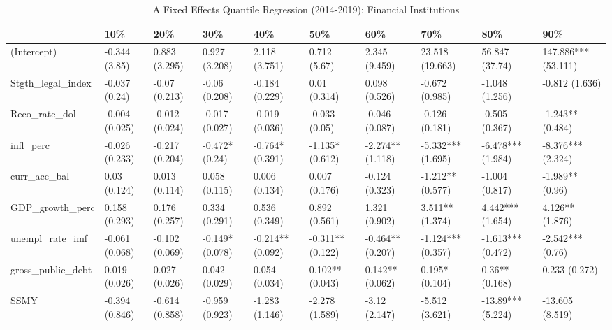 \begin{table}[ht]
\centering
\caption{A Fixed Effects Quantile Regression (2014-2019): Financial Institutions} 
\begingroup\small
\begin{tabular}{llllllllll}
  \toprule
 & 10\% & 20\% & 30\% & 40\% & 50\% & 60\% & 70\% & 80\% & 90\% \\ 
  \midrule
(Intercept) & -0.344 (3.85) & 0.883 (3.295) & 0.927 (3.208) & 2.118 (3.751) & 0.712 (5.67) & 2.345 (9.459) & 23.518 (19.663) & 56.847 (37.74) & 147.886*** (53.111) \\ 
  Stgth\_legal\_index & -0.037 (0.24) & -0.07 (0.213) & -0.06 (0.208) & -0.184 (0.229) & 0.01 (0.314) & 0.098 (0.526) & -0.672 (0.985) & -1.048 (1.256) & -0.812 (1.636) \\ 
  Reco\_rate\_dol & -0.004 (0.025) & -0.012 (0.024) & -0.017 (0.027) & -0.019 (0.036) & -0.033 (0.05) & -0.046 (0.087) & -0.126 (0.181) & -0.505 (0.367) & -1.243** (0.484) \\ 
  infl\_perc & -0.026 (0.233) & -0.217 (0.204) & -0.472* (0.24) & -0.764* (0.391) & -1.135* (0.612) & -2.274** (1.118) & -5.332*** (1.695) & -6.478*** (1.984) & -8.376*** (2.324) \\ 
  curr\_acc\_bal & 0.03 (0.124) & 0.013 (0.114) & 0.058 (0.115) & 0.006 (0.134) & 0.007 (0.176) & -0.124 (0.323) & -1.212** (0.577) & -1.004 (0.817) & -1.989** (0.96) \\ 
  GDP\_growth\_perc & 0.158 (0.293) & 0.176 (0.257) & 0.334 (0.291) & 0.536 (0.349) & 0.892 (0.561) & 1.321 (0.902) & 3.511** (1.374) & 4.442*** (1.654) & 4.126** (1.876) \\ 
  unempl\_rate\_imf & -0.061 (0.068) & -0.102 (0.069) & -0.149* (0.078) & -0.214** (0.092) & -0.311** (0.122) & -0.464** (0.207) & -1.124*** (0.357) & -1.613*** (0.472) & -2.542*** (0.76) \\ 
  gross\_public\_debt & 0.019 (0.026) & 0.027 (0.026) & 0.042 (0.029) & 0.054 (0.034) & 0.102** (0.043) & 0.142** (0.062) & 0.195* (0.104) & 0.36** (0.168) & 0.233 (0.272) \\ 
  SSMY & -0.394 (0.846) & -0.614 (0.858) & -0.959 (0.923) & -1.283 (1.146) & -2.278 (1.589) & -3.12 (2.147) & -5.512 (3.621) & -13.89*** (5.224) & -13.605 (8.519) \\ 
   \bottomrule
\end{tabular}
\endgroup
\end{table}
